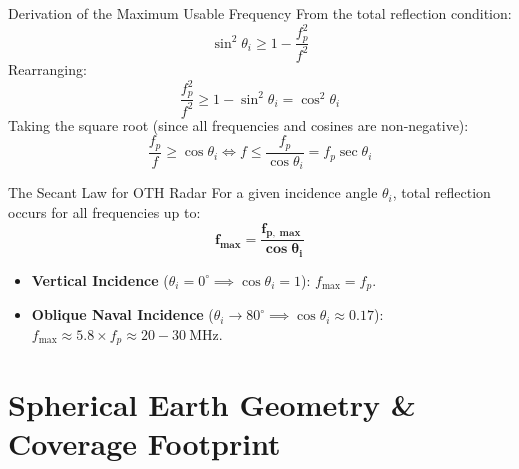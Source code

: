 \documentclass[aspectratio=169, 10pt]{beamer}
\begin{document}
\begin{frame}{Derivation of the Maximum Usable Frequency}
\small
    From the total reflection condition:
    \begin{equation}
        \sin^2\theta_i \ge 1 - \frac{f_p^2}{f^2}
    \end{equation}
    Rearranging:
    \begin{equation}
        \frac{f_p^2}{f^2} \ge 1 - \sin^2\theta_i = \cos^2\theta_i
    \end{equation}
    Taking the square root (since all frequencies and cosines are non-negative):
    \begin{equation}
        \frac{f_p}{f} \ge \cos\theta_i \iff f \le \frac{f_p}{\cos\theta_i} = f_p \sec\theta_i
    \end{equation}
\vspace{-0.6em}
    \begin{alertblock}{\small The Secant Law for OTH Radar}
        For a given incidence angle $\theta_i$, total reflection occurs for all frequencies up to:
        \begin{equation}
            \mathbf{f_{\max} = \frac{f_{p,\max}}{\cos\theta_i}}
        \end{equation}
        \begin{itemize}
            \item \textbf{Vertical Incidence} ($\theta_i = 0^\circ \implies \cos\theta_i = 1$): $f_{\max} = f_p$.
            \item \textbf{Oblique Naval Incidence} ($\theta_i \to 80^\circ \implies \cos\theta_i \approx 0.17$): $f_{\max} \approx 5.8 \times f_p \approx 20-\SI{30}{\mega\hertz}$.
        \end{itemize}
    \end{alertblock}
\end{frame}

\section{Spherical Earth Geometry \& Coverage Footprint}
\end{document}
